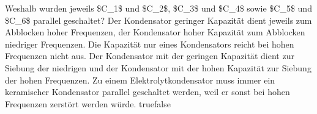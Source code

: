     {Weshalb wurden jeweils \$C\_1\$ und \$C\_2\$, \$C\_3\$ und \$C\_4\$ sowie \$C\_5\$ und \$C\_6\$ parallel geschaltet?}
    {Der Kondensator geringer Kapazität dient jeweils zum Abblocken hoher Frequenzen, der Kondensator hoher Kapazität zum Abblocken niedriger Frequenzen.}
    {Die Kapazität nur eines Kondensators reicht bei hohen Frequenzen nicht aus.}
    {Der Kondensator mit der geringen Kapazität dient zur Siebung der niedrigen und der Kondensator mit der hohen Kapazität zur Siebung der hohen Frequenzen.}
    {Zu einem Elektrolytkondensator muss immer ein keramischer Kondensator parallel geschaltet werden, weil er sonst bei hohen Frequenzen zerstört werden würde.}
    {true}{false}